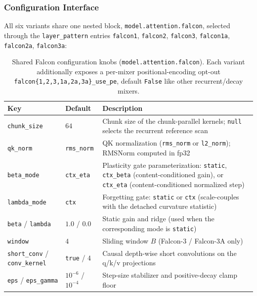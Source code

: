 \subsubsection{Configuration Interface}

All six variants share one nested block, \texttt{model.attention.falcon}, selected through the \texttt{layer\_pattern} entries \texttt{falcon1}, \texttt{falcon2}, \texttt{falcon3}, \texttt{falcon1a}, \texttt{falcon2a}, \texttt{falcon3a}:

\begin{table}[H]
\centering
\small
\begin{tabularx}{0.95\linewidth}{llX}
\toprule
\textbf{Key} & \textbf{Default} & \textbf{Description} \\
\midrule
\texttt{chunk\_size} & $64$ & Chunk size of the chunk-parallel kernels; \texttt{null} selects the recurrent reference scan \\
\texttt{qk\_norm} & \texttt{rms\_norm} & QK normalization (\texttt{rms\_norm} or \texttt{l2\_norm}); RMSNorm computed in fp32 \\
\texttt{beta\_mode} & \texttt{ctx\_eta} & Plasticity gate parameterization: \texttt{static}, \texttt{ctx\_beta} (content-conditioned gain), or \texttt{ctx\_eta} (content-conditioned normalized step) \\
\texttt{lambda\_mode} & \texttt{ctx} & Forgetting gate: \texttt{static} or \texttt{ctx} (scale-couples with the detached curvature statistic) \\
\texttt{beta} / \texttt{lambda} & $1.0$ / $0.0$ & Static gain and ridge (used when the corresponding mode is \texttt{static}) \\
\texttt{window} & $4$ & Sliding window $B$ (Falcon-3 / Falcon-3A only) \\
\texttt{short\_conv} / \texttt{conv\_kernel} & \texttt{true} / $4$ & Causal depth-wise short convolutions on the q/k/v projections \\
\texttt{eps} / \texttt{eps\_gamma} & $10^{-6}$ / $10^{-4}$ & Step-size stabilizer and positive-decay clamp floor \\
\bottomrule
\end{tabularx}
\caption{Shared Falcon configuration knobs (\texttt{model.attention.falcon}). Each variant additionally exposes a per-mixer positional-encoding opt-out \texttt{falcon\{1,2,3,1a,2a,3a\}\_use\_pe}, default \texttt{False} like other recurrent/decay mixers.}
\label{tab:falcon-knobs}
\end{table}

